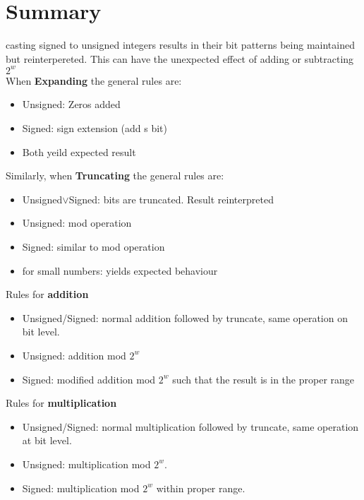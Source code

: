 \documentclass[12pt]{book}
\begin{document}
\section*{Summary}
casting signed to unsigned integers results in their bit patterns being maintained
        but reinterpereted.
This can have the unexpected effect of adding or subtracting $2^w$\\
When \textbf{Expanding} the general rules are:
\begin{itemize}
        \item Unsigned: Zeros added
        \item Signed: sign extension (add s bit)
        \item Both yeild expected result
\end{itemize}

Similarly, when \textbf{Truncating} the general rules are:
\begin{itemize}
        \item Unsigned$\vee$Signed: bits are truncated. Result reinterpreted
        \item  Unsigned: mod operation
        \item Signed: similar to mod operation
        \item for small numbers: yields expected behaviour  
\end{itemize}

Rules for \textbf{addition}
\begin{itemize}
        \item Unsigned/Signed: normal addition followed by truncate, 
                same operation on bit level.
        \item Unsigned: addition mod $2^w$
        \item Signed: modified addition mod  $2^w$ such that the result is in the  
                proper range
\end{itemize}

Rules for \textbf{multiplication} 
\begin{itemize}
        \item Unsigned/Signed: normal multiplication followed by truncate, same
                operation at bit level.
        \item Unsigned: multiplication mod $2^w$.
        \item Signed: multiplication mod  $2^w$ within proper range.
\end{itemize}
\end{document}
